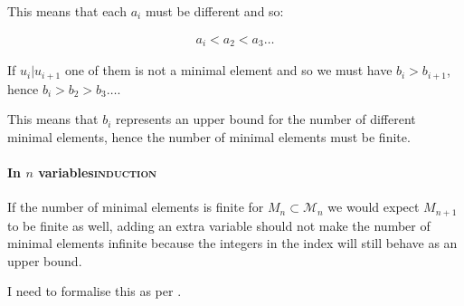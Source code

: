 \documentclass[a4paper,11pt,twoside]{article}
\begin{document}
This means that each \(a_i\) must be different and so:

\begin{align}
a_i < a_2 < a_3 \ldots
\end{align}

If \(u_i | u_{i+1}\) one of them is not a minimal element and so we
must have \(b_i > b_{i+1}\), hence \(b_i > b_2 > b_3 \ldots\).

This means that \(b_i\) represents an upper bound for the number of
different minimal elements, hence the number of minimal elements
must be finite.



\paragraph{In \(n\) variables\hfill{}\textsc{induction}}
\label{sec:org4056620}
If the number of minimal elements is finite for \(M_n \subset
     \mathcal{M}_n\) we would expect \(M_{n+1}\) to be finite as well,
adding an extra variable should not make the number of minimal
elements infinite because the integers in the index will still
behave as an upper bound.

I need to formalise this as per \cite[\S 1.1.2]{hibiGrobnerBasesStatistics2014}.
\end{document}
